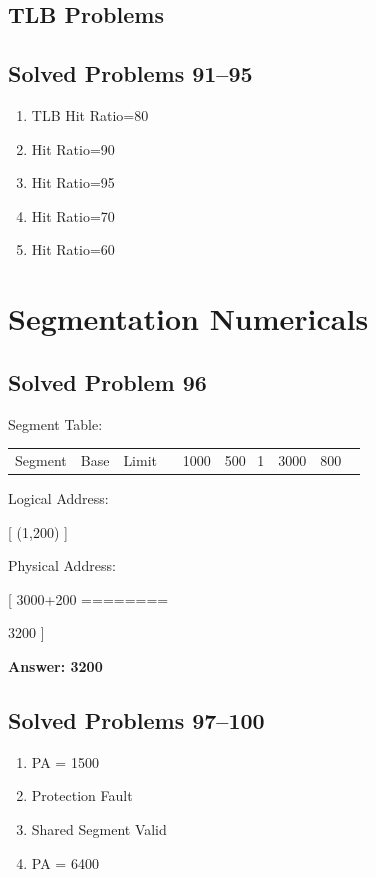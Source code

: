 \subsection{TLB Problems}

\subsection{Solved Problems 91--95}

\begin{enumerate}
\item TLB Hit Ratio=80%
\item Hit Ratio=90%
\item Hit Ratio=95%
\item Hit Ratio=70%
\item Hit Ratio=60%
\end{enumerate}

\section{Segmentation Numericals}

\subsection{Solved Problem 96}

Segment Table:

\begin{center}
\begin{tabular}{|c|c|c|}
\hline
Segment & Base & Limit \
 & 1000 & 500 \
1 & 3000 & 800 \
\hline
\end{tabular}
\end{center}

Logical Address:

[
(1,200)
]

Physical Address:

[
3000+200
========

3200
]

\textbf{Answer: 3200}

\subsection{Solved Problems 97--100}

\begin{enumerate}
\item PA = 1500
\item Protection Fault
\item Shared Segment Valid
\item PA = 6400
\end{enumerate}


